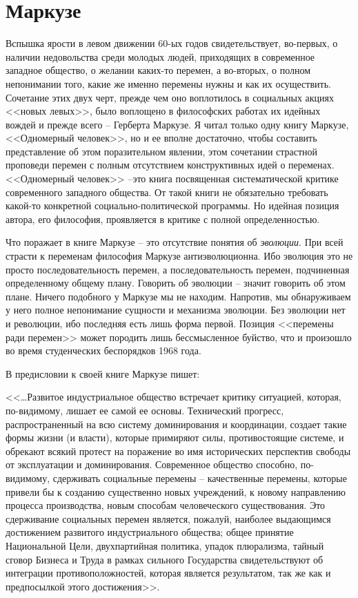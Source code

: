 \documentclass{book}
\begin{document}
\section{Маркузе}

Вспышка ярости в левом движении 60-ых годов свидетель­ствует, во-первых, о наличии 
недовольства среди молодых лю­дей, приходящих в современное западное общество, о 
желании каких-то перемен, а во-вторых, о полном непонимании то­го, какие же именно 
перемены нужны и как их осуществить. Сочетание этих двух черт, прежде чем оно 
воплотилось в социальных акциях <<новых левых>>, было воплощено в философских работах 
их идейных вождей и прежде всего -- Герберта Маркузе. Я читал только одну книгу 
Маркузе, <<Одномерный человек>>, но и ее вполне достаточно, чтобы составить 
представление об этом поразительном явлении, этом сочетании страстной проповеди 
перемен с полным отсутствием конструктивных идей о переменах. <<Одномерный человек>> 
--это книга посвященная систематической критике современного западного общества. От 
такой книги не обязательно требовать какой-то конкретной социально-политической 
программы. Но идейная позиция автора, его философия, проявляется в критике с полной 
определенностью.

Что поражает в книге Маркузе -- это отсутствие понятия об \textit{эволюции}.  При 
всей страсти к переменам философия Маркузе антиэволюционна. Ибо эволюция это не 
просто последовательность перемен, а последовательность перемен, подчиненная 
определенному общему плану. Говорить об эволюции -- значит говорить об этом плане. 
Ничего подобного у Маркузе мы не находим. Напротив, мы обнаруживаем у него полное 
непонимание сущности и механизма эволюции. Без эволюции нет и революции, ибо 
последняя есть лишь форма первой. Позиция <<перемены ради перемен>> может породить 
лишь бессмысленное буйство, что и произошло во время студенческих беспо­рядков 1968 
года.

В предисловии к своей книге Маркузе пишет:

<<\ldots Развитое индустриальное общество встречает критику ситуацией, которая, по-ви\-ди\-мо\-му, лишает ее самой ее основы. Технический прогресс, распространенный на всю систему доминирования и координации, создает такие формы жизни (и власти), которые примиряют силы, противостоящие системе, и обрекают всякий протест на поражение во имя исторических перспектив свободы от эксплуатации и доминирования. Современное общество способно, по-видимому, сдерживать социальные перемены -- качественные перемены, которые привели бы к созданию существенно новых учреждений, к новому направлению процесса производства, новым способам человеческого существования. Это сдерживание социальных перемен являет­ся, пожалуй, наиболее выдающимся достижением развитого индустриального общества; общее принятие Национальной Цели, двухпартийная политика, упадок плюрализма, тайный сговор Бизнеса и Труда в рамках сильного Государства сви­детельствуют об интеграции противоположностей, которая яв­ляется результатом, так же как и предпосылкой этого 
дости­жения>>.%
\end{document}

